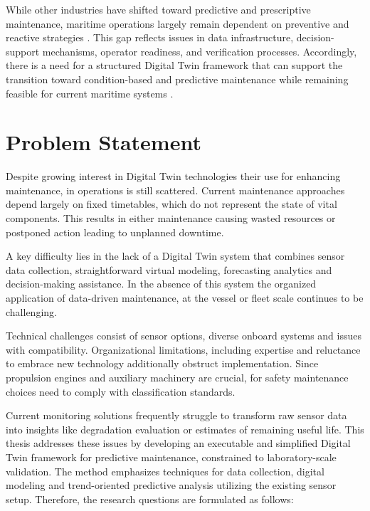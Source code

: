 While other industries have shifted toward predictive and prescriptive maintenance, maritime operations largely remain dependent on preventive and reactive strategies \cite{Wang2022}. This gap reflects issues in data infrastructure, decision-support mechanisms, operator readiness, and verification processes. Accordingly, there is a need for a structured Digital Twin framework that can support the transition toward condition-based and predictive maintenance while remaining feasible for current maritime systems \cite{Kalafatelis2025}.

\section{Problem Statement}
\label{section:problem-statement}

Despite growing interest in Digital Twin technologies their use for enhancing maintenance, in operations is still scattered. Current maintenance approaches depend largely on fixed timetables, which do not represent the state of vital components. This results in either maintenance causing wasted resources or postponed action leading to unplanned downtime.

A key difficulty lies in the lack of a Digital Twin system that combines sensor data collection, straightforward virtual modeling, forecasting analytics and decision-making assistance. In the absence of this system the organized application of data-driven maintenance, at the vessel or fleet scale continues to be challenging.

Technical challenges consist of sensor options, diverse onboard systems and issues with compatibility. Organizational limitations, including expertise and reluctance to embrace new technology additionally obstruct implementation. Since propulsion engines and auxiliary machinery are crucial, for safety maintenance choices need to comply with classification standards.

Current monitoring solutions frequently struggle to transform raw sensor data into insights like degradation evaluation or estimates of remaining useful life. This thesis addresses these issues by developing an executable and simplified Digital Twin framework for predictive maintenance, constrained to laboratory-scale validation. The method emphasizes techniques for data collection, digital modeling and trend-oriented predictive analysis utilizing the existing sensor setup. Therefore, the research questions are formulated as follows:

